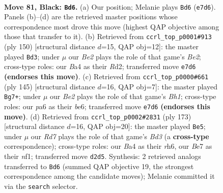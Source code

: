 \documentclass[11pt]{article}
\begin{document}
\clearpage

\begin{figure}[p]\centering
\begin{subfigure}{0.46\textwidth}\centering
\resizebox{\linewidth}{!}{%
\newchessgame
\chessboard[
  setfen={8/4b1k1/P3R3/5p2/b4P2/8/3r4/6K1 b - - 7 81},
  showmover=false,
  pgfstyle=straightmove, color=movearrow, markmove={e7-d6}
]}
\caption{}
\end{subfigure}\hfill
\begin{subfigure}{0.46\textwidth}\centering
\resizebox{\linewidth}{!}{%
\newchessgame
\chessboard[
  setfen={8/5k2/5p1p/7P/4r3/6K1/3RB3/8 w - - 13 76},
  showmover=false,
  pgfstyle=straightmove, color=movearrow, markmove={e2-d3}
]}
\caption{}
\end{subfigure}
\\[4pt]
\begin{subfigure}{0.46\textwidth}\centering
\resizebox{\linewidth}{!}{%
\newchessgame
\chessboard[
  setfen={3R3b/7P/2p1B2K/2k5/8/8/8/6r1 b - - 14 73},
  showmover=false,
  pgfstyle=straightmove, color=movearrow, markmove={h8-g7}
]}
\caption{}
\end{subfigure}\hfill
\begin{subfigure}{0.46\textwidth}\centering
\resizebox{\linewidth}{!}{%
\newchessgame
\chessboard[
  setfen={8/8/3b3R/8/2k1p3/4P2K/5r2/5N2 b - - 7 87},
  showmover=false,
  pgfstyle=straightmove, color=movearrow, markmove={d6-e5}
]}
\caption{}
\end{subfigure}
\caption{\textbf{Move 81, Black: \texttt{Bd6}.} (a) Our position; Melanie plays \texttt{Bd6} (\texttt{e7d6}). Panels (b)--(d) are the retrieved master positions whose correspondence most drove this move (highest QAP objective among those that transfer to it). (b) Retrieved from \texttt{ccrl\_top\_p0001\#913} (ply 150) [structural distance $d$=15, QAP obj=12]: the master played \texttt{Bd3}; under $\mu$ our \emph{Be2} plays the role of that game's \emph{Be2}; cross-type roles: our \emph{B}a4 as their \emph{R}d2; transferred move \texttt{e7d6} \textbf{(endorses this move)}. (c) Retrieved from \texttt{ccrl\_top\_p0000\#661} (ply 145) [structural distance $d$=16, QAP obj=7]: the master played \texttt{Bg7+}; under $\mu$ our \emph{Be2} plays the role of that game's \emph{Bh1}; cross-type roles: our \emph{p}a6 as their \emph{b}e6; transferred move \texttt{e7d6} \textbf{(endorses this move)}. (d) Retrieved from \texttt{ccrl\_top\_p0002\#2831} (ply 173) [structural distance $d$=16, QAP obj=20]: the master played \texttt{Be5}; under $\mu$ our \emph{Rd7} plays the role of that game's \emph{Bd3} (a \textbf{cross-type} correspondence); cross-type roles: our \emph{B}a4 as their \emph{r}h6, our \emph{B}e7 as their \emph{n}f1; transferred move \texttt{d2d5}. Synthesis: 2 retrieved analogs transferred to \texttt{Bd6} (summed QAP objective 19, the strongest correspondence among the candidate moves); Melanie committed it via the \texttt{search} selector.}
\label{fig:thought-m161}
\end{figure}
\end{document}
